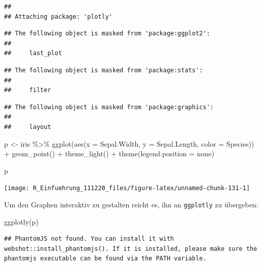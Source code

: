 \documentclass[
]{book}
\newenvironment{Shaded}{\begin{snugshade}}{\end{snugshade}}
\newcommand{\AttributeTok}[1]{\textcolor[rgb]{0.77,0.63,0.00}{#1}}
\newcommand{\FunctionTok}[1]{\textcolor[rgb]{0.00,0.00,0.00}{#1}}
\newcommand{\NormalTok}[1]{#1}
\newcommand{\OtherTok}[1]{\textcolor[rgb]{0.56,0.35,0.01}{#1}}
\newcommand{\SpecialCharTok}[1]{\textcolor[rgb]{0.00,0.00,0.00}{#1}}
\newcommand{\StringTok}[1]{\textcolor[rgb]{0.31,0.60,0.02}{#1}}
\begin{document}
\begin{verbatim}
## 
## Attaching package: 'plotly'
\end{verbatim}

\begin{verbatim}
## The following object is masked from 'package:ggplot2':
## 
##     last_plot
\end{verbatim}

\begin{verbatim}
## The following object is masked from 'package:stats':
## 
##     filter
\end{verbatim}

\begin{verbatim}
## The following object is masked from 'package:graphics':
## 
##     layout
\end{verbatim}

\begin{Shaded}
\begin{Highlighting}[]
\NormalTok{p }\OtherTok{\textless{}{-}}\NormalTok{ iris }\SpecialCharTok{\%\textgreater{}\%} 
  \FunctionTok{ggplot}\NormalTok{(}\FunctionTok{aes}\NormalTok{(}\AttributeTok{x =}\NormalTok{ Sepal.Width,}
             \AttributeTok{y =}\NormalTok{ Sepal.Length,}
             \AttributeTok{color =}\NormalTok{ Species)) }\SpecialCharTok{+}
  \FunctionTok{geom\_point}\NormalTok{() }\SpecialCharTok{+}
  \FunctionTok{theme\_light}\NormalTok{() }\SpecialCharTok{+}
  \FunctionTok{theme}\NormalTok{(}\AttributeTok{legend.position =} \StringTok{\textquotesingle{}none\textquotesingle{}}\NormalTok{)}

\NormalTok{p}
\end{Highlighting}
\end{Shaded}

\begin{center}\texttt{[image: R\_Einfuehrung\_111220\_files/figure-latex/unnamed-chunk-131-1]} \end{center}

Um den Graphen interaktiv zu gestalten reicht es, ihn an \texttt{ggplotly} zu übergeben:

\begin{Shaded}
\begin{Highlighting}[]
\FunctionTok{ggplotly}\NormalTok{(p)}
\end{Highlighting}
\end{Shaded}

\begin{verbatim}
## PhantomJS not found. You can install it with webshot::install_phantomjs(). If it is installed, please make sure the phantomjs executable can be found via the PATH variable.
\end{verbatim}
\end{document}
